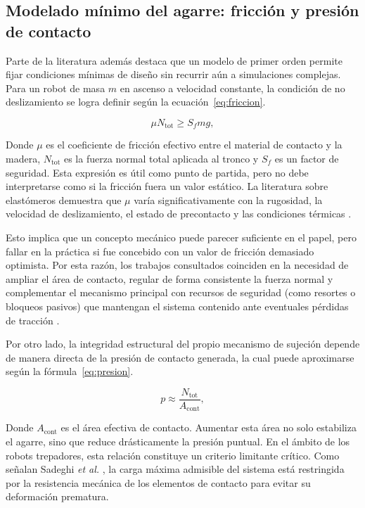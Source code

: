 \documentclass[lettersize,journal]{IEEEtran}
\begin{document}
\subsection{\textbf{Modelado mínimo del agarre: fricción y presión de contacto}}

Parte de la literatura además destaca que un modelo de primer orden permite fijar
condiciones mínimas de diseño sin recurrir aún a simulaciones complejas. Para un robot
de masa $m$ en ascenso a velocidad constante, la condición de no deslizamiento se logra
definir según la ecuación~\ref{eq:friccion}.

\begin{equation}
\mu N_{\text{tot}} \geq S_f m g,
\label{eq:friccion}
\end{equation}

Donde $\mu$ es el coeficiente de fricción efectivo entre el material de contacto y la
madera, $N_{\text{tot}}$ es la fuerza normal total aplicada al tronco y $S_f$ es un
factor de seguridad. Esta expresión es útil como punto de partida, pero no debe
interpretarse como si la fricción fuera un valor estático. La literatura sobre
elastómeros demuestra que $\mu$ varía significativamente con la rugosidad, la velocidad
de deslizamiento, el estado de precontacto y las condiciones térmicas
\cite{KaiserEtAl2024ElastomerFriction,PerssonXu2025RubberFriction}.

Esto implica que un concepto mecánico puede parecer suficiente en el papel, pero fallar
en la práctica si fue concebido con un valor de fricción demasiado optimista. Por esta
razón, los trabajos consultados coinciden en la necesidad de ampliar el área de
contacto, regular de forma consistente la fuerza normal y complementar el mecanismo
principal con recursos de seguridad (como resortes o bloqueos pasivos) que mantengan
el sistema contenido ante eventuales pérdidas de tracción
\cite{GuiTangMukhopadhyay2018,FaurouxMorillon2010SelfLock}.

Por otro lado, la integridad estructural del propio mecanismo de sujeción depende de
manera directa de la presión de contacto generada, la cual puede aproximarse según la
fórmula~\ref{eq:presion}.

\begin{equation}
p \approx \frac{N_{\text{tot}}}{A_{\text{cont}}},
\label{eq:presion}
\end{equation}

Donde $A_{\text{cont}}$ es el área efectiva de contacto. Aumentar esta área no solo
estabiliza el agarre, sino que reduce drásticamente la presión puntual. En el ámbito de
los robots trepadores, esta relación constituye un criterio limitante crítico. Como
señalan Sadeghi \emph{et al.} \cite{Sadeghi2012HumanInspired}, la carga máxima
admisible del sistema está restringida por la resistencia mecánica de los elementos de
contacto para evitar su deformación prematura.
\end{document}
